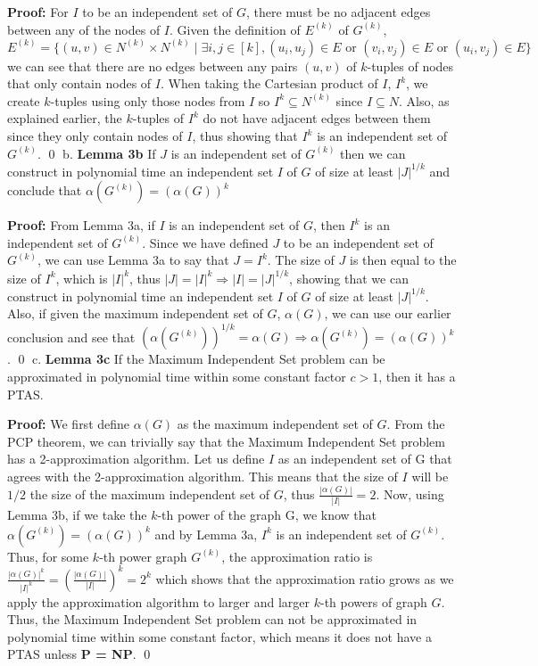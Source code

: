 \documentclass[oneside]{projectpaper} %
\begin{document}
\textbf{Proof:} For $I$ to be an independent set of $G$, there must be no adjacent edges between any of the nodes of $I$. Given the definition of $E^{(k)}$ of $G^{(k)}$, $$E^{(k)} = \{(u, v) \in N^{(k)} \times N^{(k)} \mid \exists i, j \in [k], (u_i, u_j) \in E \text{ or } (v_i, v_j) \in E \text{ or } (u_i, v_j) \in E\}$$ we can see that there are no edges between any pairs $(u, v)$ of $k$-tuples of nodes that only contain nodes of $I$. When taking the Cartesian product of $I$, $I^k$, we create $k$-tuples using only those nodes from $I$ so $I^k \subseteq N^{(k)}$ since $I \subseteq N$. Also, as explained earlier, the $k$-tuples of $I^k$ do not have adjacent edges between them since they only contain nodes of $I$, thus showing that $I^k$ is an independent set of $G^{(k)}$. \hfill\qed
\newline
\newline
{\large b.} \textbf{Lemma 3b} If $J$ is an independent set of $G^{(k)}$ then we can construct in polynomial time an independent set $I$ of $G$ of size at least $|J|^{1/k}$ and conclude that $\alpha(G^{(k)}) = (\alpha(G))^k$
\newline

\textbf{Proof:} From Lemma 3a, if $I$ is an independent set of $G$, then $I^k$ is an independent set of $G^{(k)}$. Since we have defined $J$ to be an independent set of $G^{(k)}$, we can use Lemma 3a to say that $J = I^k$. The size of $J$ is then equal to the size of $I^k$, which is $|I|^k$, thus $|J| = |I|^k \Longrightarrow |I| = |J|^{1/k}$, showing that we can construct in polynomial time an independent set $I$ of $G$ of size at least $|J|^{1/k}$. Also, if given the maximum independent set of $G$, $\alpha(G)$, we can use our earlier conclusion and see that $(\alpha(G^{(k)}))^{1/k} = \alpha(G) \Longrightarrow \alpha(G^{(k)}) = (\alpha(G))^k$. \hfill\qed
\newline
\newline
{\large c.} \textbf{Lemma 3c} If the Maximum Independent Set problem can be approximated in polynomial time within some constant factor $c > 1$, then it has a PTAS.
\newline

\textbf{Proof:} We first define $\alpha(G)$ as the maximum independent set of $G$. From the PCP theorem, we can trivially say that the Maximum Independent Set problem has a 2-approximation algorithm. Let us define $I$ as an independent set of G that agrees with the 2-approximation algorithm. This means that the size of $I$ will be $1/2$ the size of the maximum independent set of $G$, thus $\frac{|\alpha(G)|}{|I|} = 2$. Now, using Lemma 3b, if we take the $k$-th power of the graph G, we know that $\alpha(G^{(k)}) = (\alpha(G))^k$ and by Lemma 3a, $I^k$ is an independent set of $G^{(k)}$. Thus, for some $k$-th power graph $G^{(k)}$, the approximation ratio is $\frac{|\alpha(G)|^k}{|I|^k} = (\frac{|\alpha(G)|}{|I|})^k = 2^k$ which shows that the approximation ratio grows as we apply the approximation algorithm to larger and larger $k$-th powers of graph $G$. Thus, the Maximum Independent Set problem can not be approximated in polynomial time within some constant factor, which means it does not have a PTAS unless \textbf{P = NP}. \hfill\qed
\end{document}
